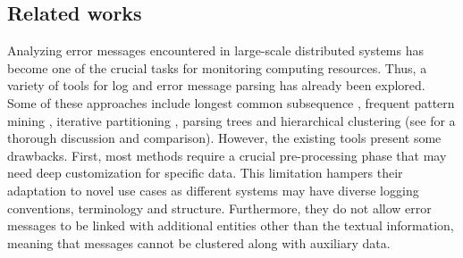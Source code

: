 \subsection{Related works} \label{sec:related_opint}


Analyzing error messages encountered in large-scale distributed systems has become one of the crucial tasks for monitoring computing resources. 
Thus, a variety of tools for log and error message parsing has already been explored. 
Some of these approaches include longest common subsequence \cite{du2016spell}, frequent pattern mining \cite{vaarandi2003slct, vaarandi2015logcluster}, iterative partitioning \cite{makanju2009iplom}, parsing trees \cite{he2017drain} and  hierarchical clustering \cite{fu2009lke} (see  for a thorough discussion and comparison).
However, the existing tools present some drawbacks. First, most methods require a crucial pre-processing phase that may need deep customization for specific data. This limitation hampers their adaptation to novel use cases as different systems may have diverse logging conventions, terminology and structure.
Furthermore, they do not allow error messages to be linked with additional entities other than the textual information, meaning that messages cannot be clustered along with auxiliary data.


